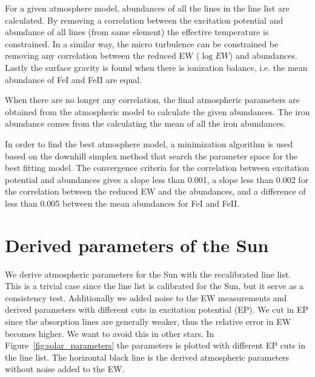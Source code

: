 \documentclass{aa}
\begin{document}
For a given atmosphere model, abundances of all the lines in the line
list are calculated. By removing a correlation between the excitation
potential and abundance of all lines (from same element) the effective
temperature is constrained. In a similar way, the micro turbulence can
be constrained be removing any correlation between the reduced EW ($\log
EW$) and abundances. Lastly the surface gravity is found when there is
ionization balance, i.e. the mean abundance of FeI and FeII are equal.

When there are no longer any correlation, the final atmospheric
parameters are obtained from the atmospheric model to calculate the
given abundances. The iron abundance comes from the calculating the mean
of all the iron abundances.

In order to find the best atmosphere model, a minimization algorithm is
used based on the downhill simplex method \citep{press1992} that search
the parameter space for the best fitting model. The convergence criteria
for the correlation between excitation potential and abundances gives a slope
less than 0.001, a slope less than 0.002 for the correlation between the
reduced EW and the abundances, and a difference of less than 0.005 between
the mean abundances for FeI and FeII.










\section{Derived parameters of the Sun}
\label{sec:derived_parameters_of_the_sun}
We derive atmospheric parameters for the Sun with the recalibrated line list.
This is a trivial case since the line list is calibrated for the Sun, but it
serve as a consistency test. Additionally we added noise to the EW measurements
and derived parameters with different cuts in excitation potential (EP). We cut
in EP since the absorption lines are generally weaker, thus the relative error
in EW becomes higher. We want to avoid this in other stars. In
Figure~\ref{fig:solar_parameters} the parameters is plotted with different EP
cuts in the line list. The horizontal black line is the derived atmospheric
parameters without noise added to the EW.
\end{document}
